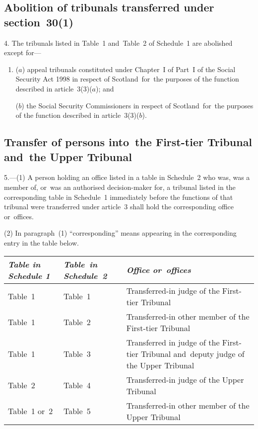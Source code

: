 \documentclass[12pt,a4paper]{article}
\begin{document}
\subsection[4. Abolition of tribunals transferred under section~30(1)]{Abolition of tribunals transferred under section~30(1)}

4.  The tribunals listed in Table~1 and~Table~2 of Schedule~1 are abolished except for—
\begin{enumerate}\item[]
($a$) appeal tribunals constituted under Chapter~I of Part~I of the Social Security Act 1998 in respect of Scotland~for~the purposes of the function described in article~3(3)($a$); and

($b$) the Social Security Commissioners in respect of Scotland~for~the purposes of the function described in article~3(3)($b$).
\end{enumerate}

\subsection[5. Transfer of persons into~the First-tier Tribunal and~the Upper Tribunal]{Transfer of persons into~the First-tier Tribunal and~the Upper Tribunal}

5.---(1)  A person holding an office listed in a table in Schedule~2 who was, was a member of, or~was an authorised decision-maker for, a tribunal listed in the corresponding table in Schedule~1 immediately before the functions of that tribunal were transferred under article~3 shall hold the corresponding office or~offices.

(2) In paragraph~(1) “corresponding” means appearing in the corresponding entry in the table below.

{\footnotesize\noindent{}
\begin{longtable}{p{53.78494pt}p{54.8609pt}p{245.3638pt}}
\hline
\itshape Table in Schedule 1	& \itshape Table~in Schedule~2	& \itshape Office or~offices\\
\hline
\endhead
\hline
\endlastfoot
Table~1	&Table~1	&Transferred-in judge of the First-tier Tribunal\\
Table~1	&Table~2	&Transferred-in other member of the First-tier Tribunal\\
Table~1	&Table~3	&Transferred in judge of the First-tier Tribunal and~deputy judge of the Upper Tribunal\\
Table~2	&Table~4	&Transferred-in judge of the Upper Tribunal\\
Table~1 or~2	&Table~5	&Transferred-in other member of the Upper Tribunal\\
\end{longtable}

}
\end{document}

